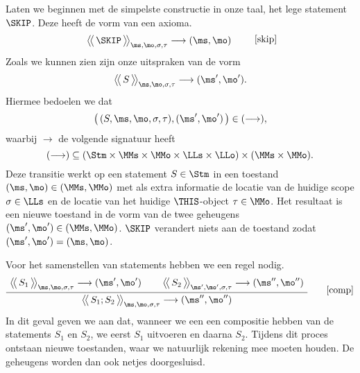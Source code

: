 Laten we beginnen met de simpelste constructie in onze taal, het lege statement $\SKIP$. Deze heeft de vorm van een axioma.
%
\begin{equation*}
  \AxiomC{$
    \Config{\SKIP}{\ms, \mo, \sigma, \tau}
    \longrightarrow
    (\ms, \mo)
  $}
  {\DisplayProof}
  \tag*{[skip]}
\end{equation*}
%
Zoals we kunnen zien zijn onze uitspraken van de vorm
%
\begin{equation*}
  \Config{S}{\ms,\mo,\sigma,\tau} \longrightarrow (\ms',\mo').
\end{equation*}
%
Hiermee bedoelen we dat
%
\begin{equation*}
  \big(\,(S,\ms,\mo,\sigma,\tau), (\ms',\mo')\,\big) \in (\longrightarrow),
\end{equation*}
%
waarbij $\longrightarrow$ de volgende signatuur heeft 
%
\begin{equation*}
  (\longrightarrow) \subseteq (\Stm \times \MMs \times \MMo \times \LLs \times \LLo) \times (\MMs \times \MMo).
\end{equation*}
%
Deze transitie werkt op een statement $S\in\Stm$ in een toestand $(\ms,\mo)\in(\MMs,\MMo)$ met als extra informatie de locatie van de huidige scope $\sigma\in\LLs$ en de locatie van het huidige $\THIS$-object $\tau\in\MMo$. Het resultaat is een nieuwe toestand in de vorm van de twee geheugens $(\ms',\mo')\in(\MMs,\MMo)$. $\SKIP$ verandert niets aan de toestand zodat $(\ms',\mo')=(\ms,\mo)$.

Voor het samenstellen van statements hebben we een regel nodig.
%
\begin{gather*}
  \AxiomC{$
    \Config{S_1}{\ms, \mo, \sigma, \tau}
    \longrightarrow
    (\ms', \mo')
  $}
  \AxiomC{$
    \Config{S_2}{\ms', \mo', \sigma, \tau}
    \longrightarrow
    (\ms'', \mo'')
  $}
  \BinaryInfC{$
    \Config{S_1; S_2}{\ms, \mo, \sigma, \tau}
    \longrightarrow
    (\ms'', \mo'')
  $}
  {\DisplayProof}
  \tag*{[comp]}
\end{gather*}
%
In dit geval geven we aan dat, wanneer we een een compositie hebben van de statements $S_1$ en $S_2$, we eerst $S_1$ uitvoeren%
en daarna $S_2$. Tijdens dit proces ontstaan nieuwe toestanden, waar we natuurlijk rekening mee moeten houden. De geheugens worden dan ook netjes doorgesluisd.

